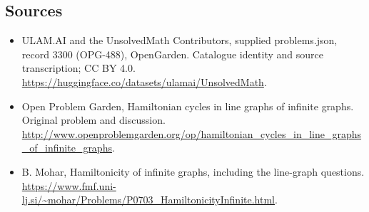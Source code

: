 \documentclass[11pt,a4paper]{article}
\begin{document}
\subsection{Sources}
\begin{itemize}
\item[S1] ULAM.AI and the UnsolvedMath Contributors, supplied problems.json, record 3300 (OPG-488), OpenGarden. Catalogue identity and source transcription; CC BY 4.0.
\url{https://huggingface.co/datasets/ulamai/UnsolvedMath}.
\item[S2] Open Problem Garden, Hamiltonian cycles in line graphs of infinite graphs. Original problem and discussion.
\url{http://www.openproblemgarden.org/op/hamiltonian_cycles_in_line_graphs_of_infinite_graphs}.
\item[S3] B. Mohar, Hamiltonicity of infinite graphs, including the line-graph questions.
\url{https://www.fmf.uni-lj.si/~mohar/Problems/P0703_HamiltonicityInfinite.html}.
\end{itemize}
\end{document}
